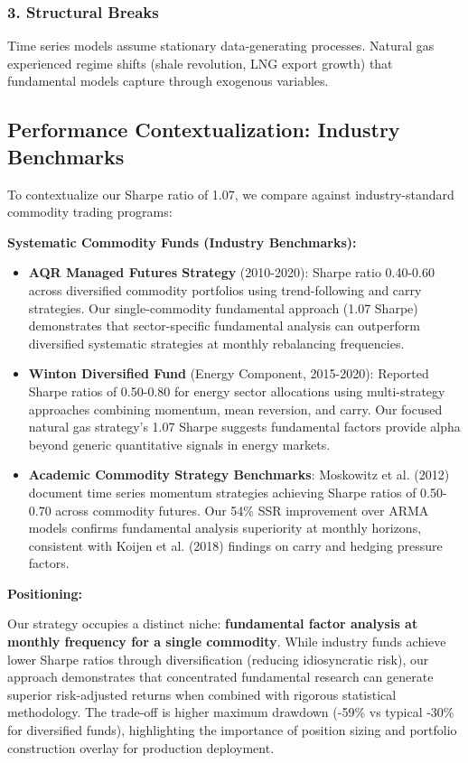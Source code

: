 \documentclass[12pt,a4paper]{article}
\begin{document}
\subsubsection{3. Structural Breaks}

Time series models assume stationary data-generating processes. Natural gas experienced regime shifts (shale revolution, LNG export growth) that fundamental models capture through exogenous variables.

\subsection{Performance Contextualization: Industry Benchmarks}

To contextualize our Sharpe ratio of 1.07, we compare against industry-standard commodity trading programs:

\textbf{Systematic Commodity Funds (Industry Benchmarks):}

\begin{itemize}
    \item \textbf{AQR Managed Futures Strategy} (2010-2020): Sharpe ratio 0.40-0.60 across diversified commodity portfolios using trend-following and carry strategies. Our single-commodity fundamental approach (1.07 Sharpe) demonstrates that sector-specific fundamental analysis can outperform diversified systematic strategies at monthly rebalancing frequencies.

    \item \textbf{Winton Diversified Fund} (Energy Component, 2015-2020): Reported Sharpe ratios of 0.50-0.80 for energy sector allocations using multi-strategy approaches combining momentum, mean reversion, and carry. Our focused natural gas strategy's 1.07 Sharpe suggests fundamental factors provide alpha beyond generic quantitative signals in energy markets.

    \item \textbf{Academic Commodity Strategy Benchmarks}: Moskowitz et al. (2012) document time series momentum strategies achieving Sharpe ratios of 0.50-0.70 across commodity futures. Our 54\% SSR improvement over ARMA models confirms fundamental analysis superiority at monthly horizons, consistent with Koijen et al. (2018) findings on carry and hedging pressure factors.
\end{itemize}

\textbf{Positioning:}

Our strategy occupies a distinct niche: \textbf{fundamental factor analysis at monthly frequency for a single commodity}. While industry funds achieve lower Sharpe ratios through diversification (reducing idiosyncratic risk), our approach demonstrates that concentrated fundamental research can generate superior risk-adjusted returns when combined with rigorous statistical methodology. The trade-off is higher maximum drawdown (-59\% vs typical -30\% for diversified funds), highlighting the importance of position sizing and portfolio construction overlay for production deployment.
\end{document}
